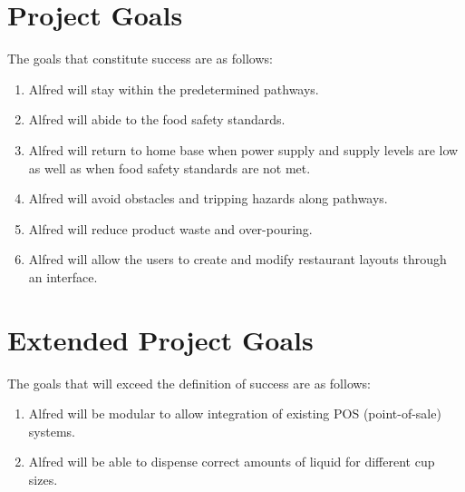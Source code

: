 \documentclass [11pt]{article}
\begin{document}

\section{Project Goals}
The goals that constitute success are as follows:

\begin{enumerate}[label=G\arabic*:, ref =\arabic*, leftmargin=0.5in]
	
	\item Alfred will stay within the predetermined pathways.
	\item Alfred will abide to the food safety standards. 
	\item Alfred will return to home base when power supply and supply levels are low as well as when food safety standards are not met.
	\item Alfred will avoid obstacles and tripping hazards along pathways.
	\item Alfred will reduce product waste and over-pouring.	
	\item Alfred will allow the users to create and modify restaurant layouts through an interface.

	
\end{enumerate}


\section{Extended Project Goals}
The goals that will exceed the definition of success are as follows: 

\begin{enumerate}[label=E\arabic*:, ref =\arabic*, leftmargin=0.5in]	

	\item Alfred will be modular to allow integration of existing POS (point-of-sale) systems.
	\item Alfred will be able to dispense correct amounts of liquid for different cup sizes.

\end{enumerate}
\end{document}
